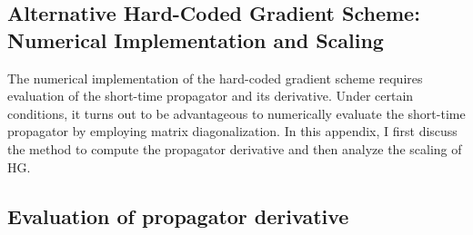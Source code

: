 \begin{appendices}
\chapter{Alternative Hard-Coded Gradient Scheme: Numerical Implementation and Scaling}
\label{app:matdiag}

The numerical implementation of the hard-coded gradient scheme requires evaluation of the short-time propagator and its derivative. Under certain conditions, it turns out to be advantageous to numerically evaluate the short-time propagator by employing matrix diagonalization. In this appendix, I first discuss the method to compute the propagator derivative and then analyze the scaling of HG.


\section{Evaluation of propagator derivative}
\label{sec:app_prop_deriv}


\end{appendices}
